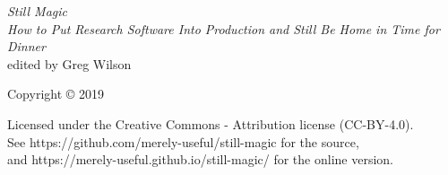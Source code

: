 {\Huge\itshape Still Magic}\\[\baselineskip]

{\large\itshape
  How to Put Research Software Into Production and Still Be Home in Time for Dinner
}\\[0.2\textheight]

{\large edited by Greg Wilson}\par

\vfill

{\large Copyright {\copyright} 2019}

\vspace*{\baselineskip}


\vspace*{\baselineskip}

{\small
  Licensed under the Creative Commons - Attribution license (CC-BY-4.0).
  \\
  See https://github.com/merely-useful/still-magic for the source,\\
  and https://merely-useful.github.io/still-magic/ for the online version.
}
